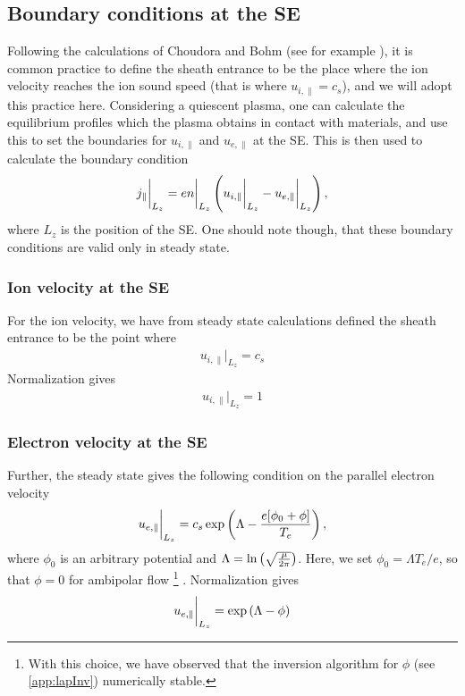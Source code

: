 \subsection{Boundary conditions at the SE}
\label{sec:BCatSE}
%
Following the calculations of Choudora and Bohm (see for example \cite{Stangeby2000book}), it is common practice to define the sheath entrance to be the place where the ion velocity reaches the ion sound speed (that is where $u_{i,\|}=c_s$), and we will adopt this practice here.
Considering a quiescent plasma, one can calculate the equilibrium profiles which the plasma obtains in contact with materials, and use this to set the boundaries for $u_{i, \|}$ and $u_{e, \|}$ at the SE.
This is then used to calculate the boundary condition
%
\begin{align*}
    j_\|\bigg|_{L_z}=en\bigg|_{L_z}\left(u_{i, \|}\bigg|_{L_z}-u_{e, \|}\bigg|_{L_z}\right),
\end{align*}
%
where $L_z$ is the position of the SE.
One should note though, that these boundary conditions are valid only in steady state.

\subsubsection{Ion velocity at the SE}
For the ion velocity, we have from steady state calculations defined the sheath entrance to be the point where
%
\begin{align*}
    u_{i,\|} \bigg|_{L_z} = c_s
\end{align*}
%
Normalization gives
%
\begin{align*}
    u_{i,\|} \bigg|_{L_z} = 1
\end{align*}
%

\subsubsection{Electron velocity at the SE}
%
Further, the steady state gives the following condition on the parallel electron velocity
%
\begin{align*}
    u_{e,\|} \bigg|_{L_z} = c_s \exp\left(\Lambda - \frac{e[\phi_0 + \phi]}{T_e}\right),
\end{align*}
%
where $\phi_0$ is an arbitrary potential and $\Lambda=\ln\left(\sqrt{\frac{\mu}{2\pi}}\right)$.
Here, we set $\phi_0=\Lambda T_e/e$, so that $\phi=0$ for ambipolar flow%
%
\footnote{With this choice, we have observed that the inversion algorithm for $\phi$ (see \cref{app:lapInv}) numerically stable.}%
%
.
Normalization gives
%
\begin{align*}
    u_{e,\|} \bigg|_{L_z} = \exp\left(\Lambda - \phi\right)
\end{align*}
%

